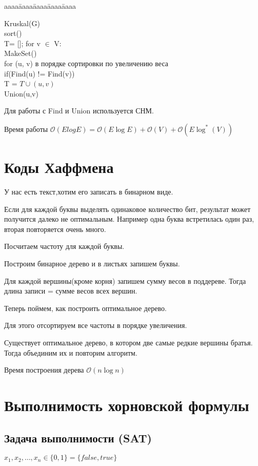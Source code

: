 \documentclass[12pt]{article}
\def\t{\texttt}
\def\O{\mathcal{O}}
\newenvironment{MyTabbing}{
\t\bgroup
\begin{tabbing}
aaaa\=aaaa\=aaaa\=aaaa\=aaaa\kill
}{
\end{tabbing}
\t\egroup
}
\begin{document}
\begin{MyTabbing}
Kruskal(G)\\
sort()\\
T= [];
for v $\in$ V:\\
\>MakeSet()\\
for (u, v) в порядке сортировки по увеличению веса\\
\>if(Find(u) != Find(v))\\
\>\>T = $T \cup (u, v)$\\
\>\>Union(u,v)\\
\end{MyTabbing}


Для работы с Find и Union  используется СНМ.

Время работы $\O(E log E) = \O(E \log E) + \O(V) + \O(E \log^*(V))$

\section{Коды Хаффмена}

У нас  есть текст,хотим его записать в бинарном виде. 

Если для каждой буквы выделять одинаковое количество бит, результат может получится далеко не оптимальным. Например одна буква встретилась один раз, вторая повторяется очень много.

Посчитаем частоту для каждой буквы.

Построим бинарное дерево и в листьях запишем буквы.

Для каждой вершины(кроме корня) запишем сумму весов в поддереве. Тогда длина записи = сумме весов всех вершин.


Теперь поймем, как построить оптимальное дерево. 

Для этого отсортируем все частоты в порядке увеличения. 

Существует оптимальное дерево, в котором две самые редкие вершины братья. Тогда объединим их и повторим алгоритм.

Время построения дерева $\O(n \log n)$
 
\section{Выполнимость хорновской формулы}

\subsection{Задача выполнимости (SAT)}
  $x_1, x_2, \ldots, x_n \in \{0, 1\} = \{false, true\}$
  
\end{document}
